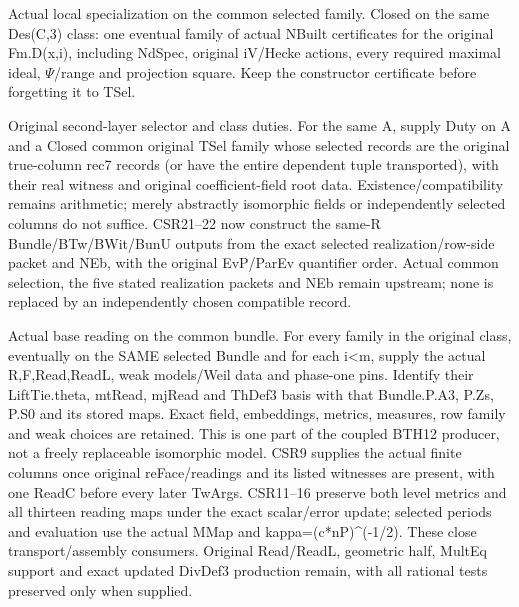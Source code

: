 \begin{description}[style=nextline]
\item[29. LOCAL\_NBUILT\_COMMON --- C] Actual local specialization on the common selected family. Closed on the same Des(C,3) class: one eventual family of actual NBuilt certificates for the original Fm.D(x,i), including NdSpec, original iV/Hecke actions, every required maximal ideal, $\Psi$/range and projection square. Keep the constructor certificate before forgetting it to TSel.

\item[30. SECOND\_LAYER\_COMPATIBLE\_SELECTION --- C] Original second-layer selector and class duties. For the same A, supply Duty on A and a Closed common original TSel family whose selected records are the original true-column rec7 records (or have the entire dependent tuple transported), with their real witness and original coefficient-field root data. Existence/compatibility remains arithmetic; merely abstractly isomorphic fields or independently selected columns do not suffice. CSR21–22 now construct the same-R Bundle/BTw/BWit/BunU outputs from the exact selected realization/row-side packet and NEb, with the original EvP/ParEv quantifier order. Actual common selection, the five stated realization packets and NEb remain upstream; none is replaced by an independently chosen compatible record.

\item[31. BASE\_THETA\_READINGS --- C] Actual base reading on the common bundle. For every family in the original class, eventually on the SAME selected Bundle and for each i<m, supply the actual R,F,Read,ReadL, weak models/Weil data and phase-one pins. Identify their LiftTie.theta, mtRead, mjRead and ThDef3 basis with that Bundle.P.A3, P.Zs, P.S0 and its stored maps. Exact field, embeddings, metrics, measures, row family and weak choices are retained. This is one part of the coupled BTH12 producer, not a freely replaceable isomorphic model. CSR9 supplies the actual finite columns once original reFace/readings and its listed witnesses are present, with one ReadC before every later TwArgs. CSR11–16 preserve both level metrics and all thirteen reading maps under the exact scalar/error update; selected periods and evaluation use the actual MMap and kappa=(c*nP)\textasciicircum{}(-1/2). These close transport/assembly consumers. Original Read/ReadL, geometric half, MultEq support and exact updated DivDef3 production remain, with all rational tests preserved only when supplied.


\end{description}

